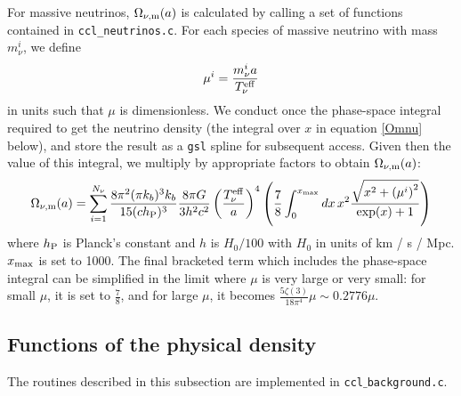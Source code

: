 \documentclass[\docopts]{\docclass}
\begin{document}
For massive neutrinos, $\Omega_{\nu, {\rm m}}(a)$ is calculated by calling a set of functions contained in {\tt ccl\_neutrinos.c}. For each species of massive neutrino with mass $m_\nu^i$, we define
\begin{equation}
\mu^i = \frac{m_{\nu}^{i}a}{T_{\nu}^{\rm eff}}
\label{mnuOT}
\end{equation}
in units such that $\mu$ is dimensionless. We conduct once the phase-space integral required to get the neutrino density (the integral over $x$ in equation \ref{Omnu} below), and store the result as a {\tt gsl} spline for subsequent access. Given then the value of this integral, we multiply by appropriate factors to obtain $\Omega_{\nu, {\rm m}}(a)$:
\begin{equation}
\Omega_{\nu, {\rm m}}(a) = \sum_{i=1}^{N_\nu} \frac{8 \pi^2(\pi k_b )^3 k_b}{15(c h_{\rm P})^3} \frac{8 \pi G}{3h^2c^2} \left(\frac{T_{\nu}^{\rm eff}}{a}\right)^4 \left(\frac{7}{8}\int_0^{x_{\rm max}} dx \, x^2 \frac{\sqrt{x^2 + \left(\mu^i\right)^2}}{\exp(x) + 1}\right)
\label{Omnu}
\end{equation}
where $h_{\rm P}$ is Planck's constant and $h$ is $H_0/100$ with $H_0$ in units of km / s / Mpc. $x_{\rm max}$ is set to 1000. The final bracketed term which includes the phase-space integral can be simplified in the limit where $\mu$ is very large or very small: for small $\mu$, it is set to $\frac{7}{8}$, and for large $\mu$, it becomes $\frac{5\zeta(3)}{18\pi^4}\mu\sim 0.2776\mu$.


\subsection{Functions of the physical density}
\label{subsec:physicaldensity}

The routines described in this subsection are implemented in {\tt ccl$\_$background.c}.
\end{document}
